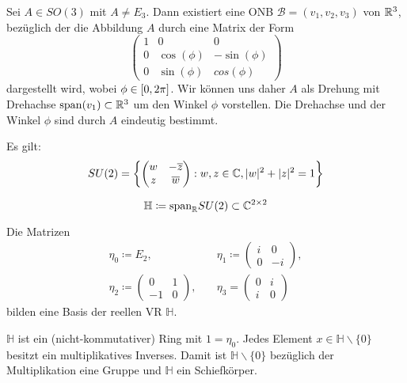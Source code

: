 \documentclass{cheat-sheet}
\newcommand{\HH}{\mathbb{H}}
\newcommand{\BB}{\mathcal{B}}
\begin{document}
\begin{satz}
  Sei $A \in SO(3)$ mit $A \not= E_3$. Dann existiert eine ONB $\BB = (v_1, v_2, v_3)$ von $\mathbb{R}^3$, bezüglich der die Abbildung $A$ durch eine Matrix der Form
  \[ \begin{pmatrix}
  1 & 0 & 0 \\
  0 & \cos(\phi) & - \sin(\phi) \\
  0 & \sin(\phi) & cos(\phi)
  \end{pmatrix} \]
  dargestellt wird, wobei $\phi \in \left[ 0, 2 \pi \right]$. Wir können uns daher $A$ als Drehung mit Drehachse $\mathrm{span}(v_1) \subset \mathbb{R}^3$ um den Winkel $\phi$ vorstellen. Die Drehachse und der Winkel $\phi$ sind durch $A$ eindeutig bestimmt.
\end{satz}


\begin{satz}
  Es gilt:
  \[ SU(2) = \left\{ \begin{pmatrix}
  w & - \overline{z} \\
  z & \overline{w}
  \end{pmatrix} : w, z \in \mathbb{C}, \lvert w\rvert^2 + \lvert z\rvert^2 = 1 \right\} \]
\end{satz}

\begin{defn}
  \[ \HH \coloneqq \mathrm{span}_{\R} SU(2) \subset \C^{2 \times 2} \]
\end{defn}

\begin{satz}
  Die Matrizen
  \begin{align*}
  \eta_0 \coloneqq E_2, \quad & \eta_1 \coloneqq \begin{pmatrix} i & 0 \\ 0 & -i \end{pmatrix}, \\
  \eta_2 \coloneqq \begin{pmatrix} 0 & 1 \\ -1 & 0 \end{pmatrix}, \quad & \eta_3 = \begin{pmatrix} 0 & i \\ i & 0 \end{pmatrix}
  \end{align*}
  bilden eine Basis der reellen VR $\mathbb{H}$.
\end{satz}

\begin{satz}
  $\HH$ ist ein (nicht-kommutativer) Ring mit $1 = \eta_0$. Jedes Element $x \in \HH \backslash \{ 0 \}$ besitzt ein multiplikatives Inverses. Damit ist $\HH \backslash \{ 0 \}$ bezüglich der Multiplikation eine Gruppe und $\HH$ ein Schiefkörper.
\end{satz}
\end{document}
